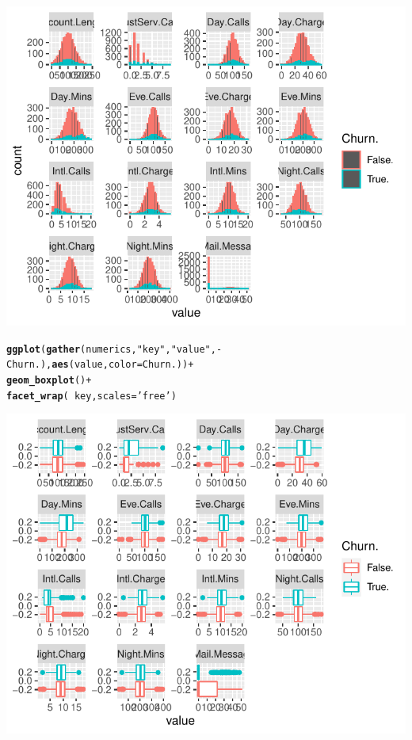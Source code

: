 \documentclass{article}\usepackage[]{graphicx}\usepackage[]{color}
\makeatletter
\def\maxwidth{ %
  \ifdim\Gin@nat@width>\linewidth
    \linewidth
  \else
    \Gin@nat@width
  \fi
}
\newcommand{\hlstr}[1]{\textcolor[rgb]{0.192,0.494,0.8}{#1}}%
\newcommand{\hlopt}[1]{\textcolor[rgb]{0,0,0}{#1}}%
\newcommand{\hlstd}[1]{\textcolor[rgb]{0.345,0.345,0.345}{#1}}%
\newcommand{\hlkwc}[1]{\textcolor[rgb]{0.333,0.667,0.333}{#1}}%
\newcommand{\hlkwd}[1]{\textcolor[rgb]{0.737,0.353,0.396}{\textbf{#1}}}%
\newenvironment{kframe}{%
 \def\at@end@of@kframe{}%
 \ifinner\ifhmode%
  \def\at@end@of@kframe{\end{minipage}}%
  \begin{minipage}{\columnwidth}%
 \fi\fi%
 \def\FrameCommand##1{\hskip\@totalleftmargin \hskip-\fboxsep
 \colorbox{shadecolor}{##1}\hskip-\fboxsep
     \hskip-\linewidth \hskip-\@totalleftmargin \hskip\columnwidth}%
 \MakeFramed {\advance\hsize-\width
   \@totalleftmargin\z@ \linewidth\hsize
   \@setminipage}}%
 {\par\unskip\endMakeFramed%
 \at@end@of@kframe}
\newenvironment{knitrout}{}{} %
\makeatother
\begin{document}
\begin{description}
\begin{knitrout}
\begin{kframe}
{\ttfamily\noindent\itshape\color{messagecolor}{\#\# `stat\_bin()` using `bins = 30`. Pick better value with `binwidth`.}}\end{kframe}

{\centering \includegraphics[width=\maxwidth]{figure/Overviews_plots_grouped-2} 

}


\begin{kframe}\begin{alltt}
\hlkwd{ggplot}\hlstd{(}\hlkwd{gather}\hlstd{(numerics,} \hlstr{"key"}\hlstd{,} \hlstr{"value"}\hlstd{,} \hlopt{-}\hlstd{Churn.),} \hlkwd{aes}\hlstd{(value,} \hlkwc{color}\hlstd{=Churn.))} \hlopt{+}
  \hlkwd{geom_boxplot}\hlstd{()} \hlopt{+}
  \hlkwd{facet_wrap}\hlstd{(}\hlopt{~}\hlstd{key,} \hlkwc{scales}\hlstd{=}\hlstr{'free'}\hlstd{)}
\end{alltt}
\end{kframe}

{\centering \includegraphics[width=\maxwidth]{figure/Overviews_plots_grouped-3} 

}
\end{knitrout}
\end{description}
\end{document}
